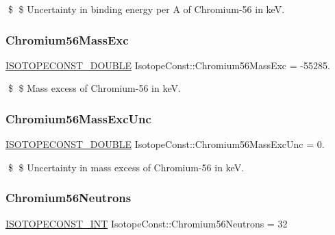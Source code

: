 \$ \$ Uncertainty in binding energy per A of Chromium-\/56 in keV. \mbox{\label{group___isotope_const-_chromium-_cr56_ga3b1eb10ec0c353a064cd6ad1ba085115}} 
\subsubsection{\texorpdfstring{Chromium56\+Mass\+Exc}{Chromium56MassExc}}
{\footnotesize\ttfamily \mbox{\hyperlink{group___isotope_const-_macros_ga8f45a7272ce02c0b4c65c44636ed719a}{I\+S\+O\+T\+O\+P\+E\+C\+O\+N\+S\+T\+\_\+\+D\+O\+U\+B\+LE}} Isotope\+Const\+::\+Chromium56\+Mass\+Exc = -\/55285.}

\$ \$ Mass excess of Chromium-\/56 in keV. \mbox{\label{group___isotope_const-_chromium-_cr56_gab43d5933e9835adef9b6e7d441584b9c}} 
\subsubsection{\texorpdfstring{Chromium56\+Mass\+Exc\+Unc}{Chromium56MassExcUnc}}
{\footnotesize\ttfamily \mbox{\hyperlink{group___isotope_const-_macros_ga8f45a7272ce02c0b4c65c44636ed719a}{I\+S\+O\+T\+O\+P\+E\+C\+O\+N\+S\+T\+\_\+\+D\+O\+U\+B\+LE}} Isotope\+Const\+::\+Chromium56\+Mass\+Exc\+Unc = 0.}

\$ \$ Uncertainty in mass excess of Chromium-\/56 in keV. \mbox{\label{group___isotope_const-_chromium-_cr56_ga2e97422cbd12c9ed470fff736b5268c8}} 
\subsubsection{\texorpdfstring{Chromium56\+Neutrons}{Chromium56Neutrons}}
{\footnotesize\ttfamily \mbox{\hyperlink{group___isotope_const-_macros_ga5f18360b3e99483a35c32d789e62621c}{I\+S\+O\+T\+O\+P\+E\+C\+O\+N\+S\+T\+\_\+\+I\+NT}} Isotope\+Const\+::\+Chromium56\+Neutrons = 32}

